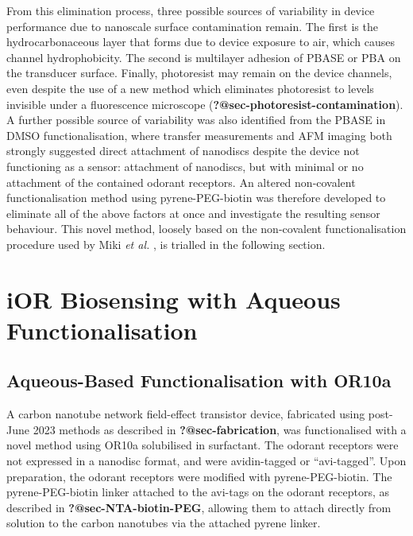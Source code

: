 \documentclass[
  a4paper,
]{scrbook}
\begin{document}
From this elimination process, three possible sources of variability in
device performance due to nanoscale surface contamination remain. The
first is the hydrocarbonaceous layer that forms due to device exposure
to air, which causes channel hydrophobicity. The second is multilayer
adhesion of PBASE or PBA on the transducer surface. Finally, photoresist
may remain on the device channels, even despite the use of a new method
which eliminates photoresist to levels invisible under a fluorescence
microscope (\textbf{?@sec-photoresist-contamination}). A further
possible source of variability was also identified from the PBASE in
DMSO functionalisation, where transfer measurements and AFM imaging both
strongly suggested direct attachment of nanodiscs despite the device not
functioning as a sensor: attachment of nanodiscs, but with minimal or no
attachment of the contained odorant receptors. An altered non-covalent
functionalisation method using pyrene-PEG-biotin was therefore developed
to eliminate all of the above factors at once and investigate the
resulting sensor behaviour. This novel method, loosely based on the
non-covalent functionalisation procedure used by Miki \emph{et al.}
\autocite{Miki2019}, is trialled in the following section.

\hypertarget{ior-biosensing-with-aqueous-functionalisation}{%
\section{iOR Biosensing with Aqueous
Functionalisation}\label{ior-biosensing-with-aqueous-functionalisation}}

\hypertarget{aqueous-based-functionalisation-with-or10a}{%
\subsection{Aqueous-Based Functionalisation with
OR10a}\label{aqueous-based-functionalisation-with-or10a}}

A carbon nanotube network field-effect transistor device, fabricated
using post-June 2023 methods as described in \textbf{?@sec-fabrication},
was functionalised with a novel method using OR10a solubilised in
surfactant. The odorant receptors were not expressed in a nanodisc
format, and were avidin-tagged or ``avi-tagged''. Upon preparation, the
odorant receptors were modified with pyrene-PEG-biotin. The
pyrene-PEG-biotin linker attached to the avi-tags on the odorant
receptors, as described in \textbf{?@sec-NTA-biotin-PEG}, allowing them
to attach directly from solution to the carbon nanotubes via the
attached pyrene linker.
\end{document}
